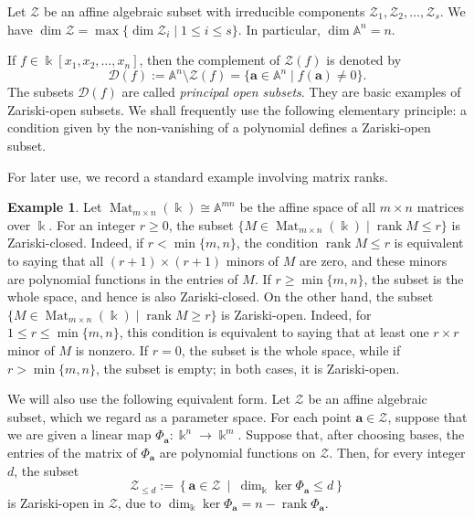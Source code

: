 \documentclass[a4,12pt]{amsart}
\numberwithin{equation}{section} %
\newcommand{\Mat}{\operatorname{Mat}}
\theoremstyle{definition} %
\newtheorem{example}[theorem]{Example} %
\begin{document}
Let $\mathcal{Z}$ be an affine algebraic subset with irreducible components $\mathcal{Z}_1,\mathcal{Z}_2,\ldots, \mathcal{Z}_s$. We have $\dim  \mathcal{Z}=\max\{\dim  \mathcal{Z}_i\mid 1\leq i\leq s\}$. In particular, $\dim\mathbb{A}^n=n$. 

If $f\in\Bbbk[x_1,x_2,\ldots,x_n]$, then the complement of $\mathcal{Z}(f)$ is denoted by
\[
\mathcal{D}(f):=\mathbb{A}^n\setminus \mathcal{Z}(f)
=
\{\mathbf{a}\in\mathbb{A}^n\mid f(\mathbf{a})\neq0\}.
\]
The subsets $\mathcal{D}(f)$ are called \emph{principal open subsets}. They are basic examples of Zariski-open subsets. We shall frequently use the following elementary principle: a condition given by the non-vanishing of a polynomial defines a Zariski-open subset. 

For later use, we record a standard example involving matrix ranks. 
\begin{example}\label{ex::open-set}
Let $\Mat_{m\times n}(\Bbbk)\cong \mathbb{A}^{mn}$ be the affine space of all $m\times n$ matrices over $\Bbbk$. For an integer $r\geq0$, the subset $\{M\in\Mat_{m\times n}(\Bbbk)\mid \operatorname{rank}M\leq r\}$ is Zariski-closed. Indeed, if $r<\min\{m,n\}$, the condition $\operatorname{rank}M\leq r$ is equivalent to saying that all $(r+1)\times(r+1)$ minors of $M$ are zero, and these minors are polynomial functions in the entries of $M$. If $r\geq\min\{m,n\}$, the subset is the whole space, and hence is also Zariski-closed. On the other hand, the subset $\{M\in\Mat_{m\times n}(\Bbbk)\mid \operatorname{rank}M\geq r\}$ is Zariski-open. Indeed, for $1\leq r\leq\min\{m,n\}$, this condition is equivalent to saying that at least one $r\times r$ minor of $M$ is nonzero. If $r=0$, the subset is the whole space, while if $r>\min\{m,n\}$, the subset is empty; in both cases, it is Zariski-open. 

We will also use the following equivalent form. Let $\mathcal{Z}$ be an affine algebraic subset, which we regard as a parameter space. For each point $\mathbf{a}\in  \mathcal{Z}$, suppose that we are given a linear map $\Phi_{\mathbf{a}}\colon \Bbbk^n\to\Bbbk^m$. Suppose that, after choosing bases, the entries of the matrix of $\Phi_{\mathbf{a}}$ are polynomial functions on $\mathcal{Z}$. Then, for every integer $d$, the subset
\[
 \mathcal{Z}_{\leq d} := \left\{
\mathbf{a}\in  \mathcal{Z}
\ \middle|\
\dim_{\Bbbk}\ker\Phi_{\mathbf{a}}\leq d
\right\}
\]
is Zariski-open in $\mathcal{Z}$, due to $\dim_{\Bbbk}\ker\Phi_{\mathbf{a}} = n-\operatorname{rank}\Phi_{\mathbf{a}}$. 
\end{example}
\end{document}
